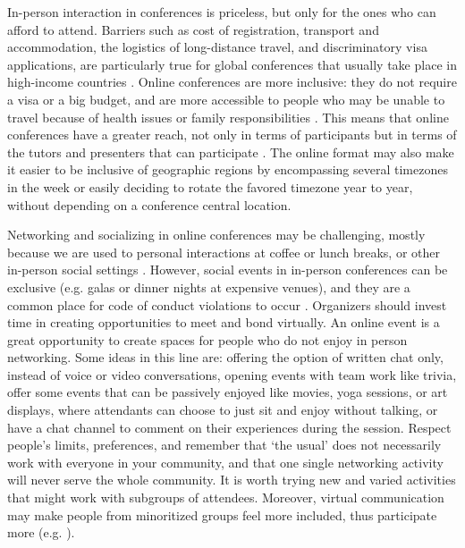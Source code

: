 \documentclass[10pt,letterpaper]{article}
\begin{document}
In-person interaction in conferences is priceless, but only for the ones who can afford to attend. 
Barriers such as cost of registration, transport and accommodation, the logistics of long-distance travel, and discriminatory visa applications, are particularly true for global conferences that usually take place in high-income countries \cite{arendDisparityConferenceRegistration2019,gewinWhatScientistsShould2019}. 
Online conferences are more inclusive: they do not require a visa or a big budget, and are more accessible to people who may be unable to travel because of health issues or family responsibilities \cite{salibaGettingGripsOnline2020}.
This means that online conferences have a greater reach, not only in terms of participants but in terms of the tutors and presenters that can participate \cite{atkinsonJournalMedicine20202021, roosOnlineConferencesNew2020}.
The online format may also make it easier to be inclusive of geographic regions by encompassing several timezones in the week or easily deciding to rotate the favored timezone year to year, without depending on a conference central location. 

Networking and socializing in online conferences may be challenging, mostly because we are used to personal interactions at coffee or lunch breaks, or other in-person social settings \cite{salibaGettingGripsOnline2020}. 
However, social events in in-person conferences can be exclusive (e.g. galas or dinner nights at expensive venues), and they are a common place for code of conduct violations to occur \cite{auroraHowRespondCode2019}. %
Organizers should invest time in creating opportunities to meet and bond virtually. 
An online event is a great opportunity to create spaces for people who do not enjoy in person networking. 
Some ideas in this line are: offering the option of written chat only, instead of voice or video conversations, opening events with team work like trivia, offer some events that can be passively enjoyed like movies, yoga sessions, or art displays, where attendants can choose to just sit and enjoy without talking, or have a chat channel to comment on their experiences during the session. Respect people's limits, preferences, and remember that `the usual' does not necessarily work with everyone in your community, and that one single networking activity will never serve the whole community. It is worth trying new and varied activities that might work with subgroups of attendees.
Moreover, virtual communication may make people from minoritized groups feel more included, thus participate more (e.g. \cite{trianaDoesOrderFacetoFace2012}).
\end{document}
